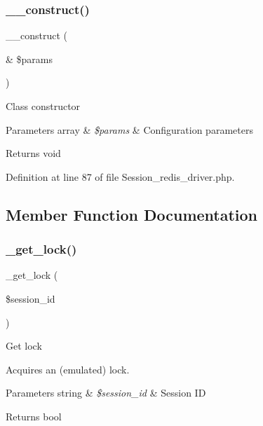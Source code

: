 \subsubsection{\texorpdfstring{\_\_construct()}{\_\_construct()}}
{\footnotesize\ttfamily \+\_\+\+\_\+construct (\begin{DoxyParamCaption}\item[{\&}]{\$params }\end{DoxyParamCaption})}

Class constructor


\begin{DoxyParams}[1]{Parameters}
array & {\em \$params} & Configuration parameters \\
\hline
\end{DoxyParams}
\begin{DoxyReturn}{Returns}
void 
\end{DoxyReturn}


Definition at line 87 of file Session\+\_\+redis\+\_\+driver.\+php.



\subsection{Member Function Documentation}
\mbox{\label{class_c_i___session__redis__driver_a2c49c8e23be3e2aca96a9d20de18ffc2}} 
\subsubsection{\texorpdfstring{\_get\_lock()}{\_get\_lock()}}
{\footnotesize\ttfamily \+\_\+get\+\_\+lock (\begin{DoxyParamCaption}\item[{}]{\$session\+\_\+id }\end{DoxyParamCaption})\hspace{0.3cm}{\ttfamily [protected]}}

Get lock

Acquires an (emulated) lock.


\begin{DoxyParams}[1]{Parameters}
string & {\em \$session\+\_\+id} & Session ID \\
\hline
\end{DoxyParams}
\begin{DoxyReturn}{Returns}
bool 
\end{DoxyReturn}


